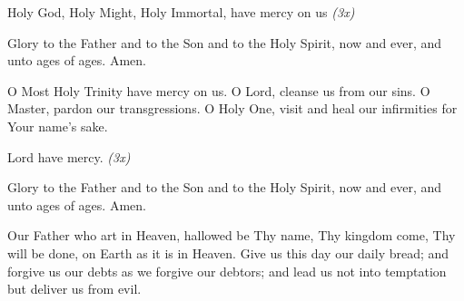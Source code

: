 Holy God, Holy Might, Holy Immortal, have mercy on us \textit{(3x)}

Glory to the Father and to the Son and to the Holy Spirit, now and ever, and unto ages of ages. Amen.

O Most Holy Trinity have mercy on us. O Lord, cleanse us from our sins. O Master, pardon our transgressions. O Holy One, visit and heal our infirmities for Your name's sake.

Lord have mercy. \textit{(3x)}

Glory to the Father and to the Son and to the Holy Spirit, now and ever, and unto ages of ages. Amen.

Our Father who art in Heaven, hallowed be Thy name, Thy kingdom come, Thy will be done, on Earth as it is in Heaven. Give us this day our daily bread; and forgive us our debts as we forgive our debtors; and lead us not into temptation but deliver us from evil.